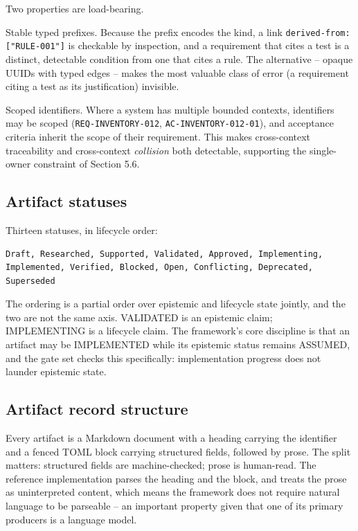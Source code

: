 \documentclass[11pt,a4paper]{article}
\begin{document}
Two properties are load-bearing.

Stable typed prefixes. Because the prefix encodes the kind, a link \texttt{derived-from: ["RULE-001"]} is checkable by inspection, and a requirement that cites a test is a distinct, detectable condition from one that cites a rule. The alternative -- opaque UUIDs with typed edges -- makes the most valuable class of error (a requirement citing a test as its justification) invisible.

Scoped identifiers. Where a system has multiple bounded contexts, identifiers may be scoped (\texttt{REQ-INVENTORY-012}, \texttt{AC-INVENTORY-012-01}), and acceptance criteria inherit the scope of their requirement. This makes cross-context traceability and cross-context \emph{collision} both detectable, supporting the single-owner constraint of Section 5.6.

\subsection{Artifact statuses}

Thirteen statuses, in lifecycle order:

\begin{Verbatim}[fontsize=\footnotesize,breaklines=true,breakanywhere=true,breakautoindent=false,samepage=false]
Draft, Researched, Supported, Validated, Approved, Implementing,
Implemented, Verified, Blocked, Open, Conflicting, Deprecated, Superseded
\end{Verbatim}

The ordering is a partial order over epistemic and lifecycle state jointly, and the two are not the same axis. VALIDATED is an epistemic claim; IMPLEMENTING is a lifecycle claim. The framework's core discipline is that an artifact may be IMPLEMENTED while its epistemic status remains ASSUMED, and the gate set checks this specifically: implementation progress does not launder epistemic state.

\subsection{Artifact record structure}

Every artifact is a Markdown document with a heading carrying the identifier and a fenced TOML block carrying structured fields, followed by prose. The split matters: structured fields are machine-checked; prose is human-read. The reference implementation parses the heading and the block, and treats the prose as uninterpreted content, which means the framework does not require natural language to be parseable -- an important property given that one of its primary producers is a language model.
\end{document}
